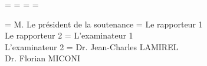 \documentclass[11pt]{thesul}
\begin{document}
\FramePartsInToc
\OddHead={{\leftmark\rightmark}{\hfil\slshape\rightmark}}
\EvenHead={{\leftmark}{{\slshape\leftmark}\hfil}}
\OddFoot={\hfil\thepage}
\EvenFoot={\thepage\hfil}
\pagestyle{ThesisHeadingsII}


\FramePartsInToc





\dominitoc





\ThesisUL

\President={
M. Le président de la soutenance
}
\Rapporteurs ={
Le rapporteur 1\\
Le rapporteur 2
}
\Examinateurs={
L'examinateur 1\\
L'examinateur 2
}
\Encadrants={
Dr. Jean-Charles LAMIREL\\
Dr. Florian MICONI
}
\end{document}
